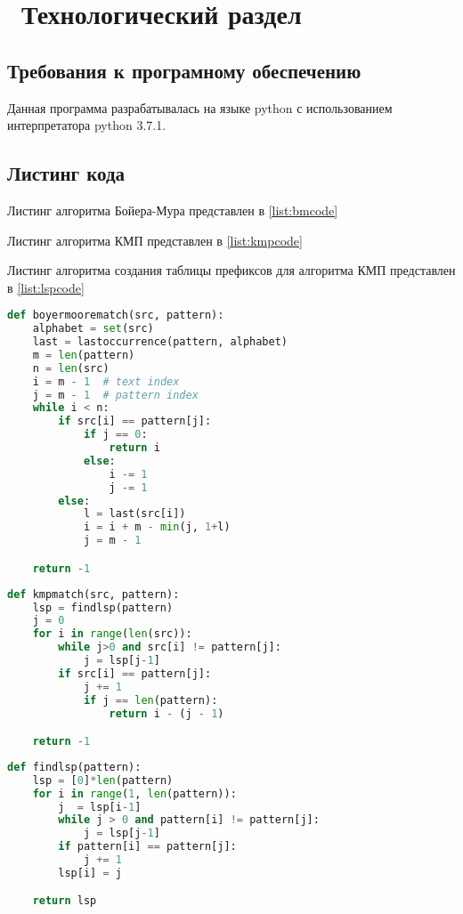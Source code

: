 \chapter{ Технологический раздел}
\section{ Требования к програмному обеспечению}
    Данная программа разрабатывалась на языке python с использованием интерпретатора python 3.7.1.

\section{ Листинг кода}

Листинг алгоритма Бойера-Мура представлен в  \ref{list:bmcode}

Листинг алгоритма КМП представлен в \ref{list:kmpcode}

Листинг алгоритма создания таблицы префиксов для алгоритма КМП представлен в \ref{list:lspcode}

\begin{lstlisting}[language=python, caption={ Листинг реализации алгоритма Бойера-Мура},
                    label={list:bmcode}]
def boyermoorematch(src, pattern):
    alphabet = set(src)
    last = lastoccurrence(pattern, alphabet)
    m = len(pattern)
    n = len(src)
    i = m - 1  # text index
    j = m - 1  # pattern index
    while i < n:
        if src[i] == pattern[j]:
            if j == 0:
                return i
            else:
                i -= 1
                j -= 1
        else:
            l = last(src[i])
            i = i + m - min(j, 1+l)
            j = m - 1 

    return -1
\end{lstlisting}

\begin{lstlisting}[language=python, caption={ Листинг реализации алгоритма КМП},
                    label={list:kmpcode}]
def kmpmatch(src, pattern):
    lsp = findlsp(pattern)
    j = 0
    for i in range(len(src)):
        while j>0 and src[i] != pattern[j]:
            j = lsp[j-1]
        if src[i] == pattern[j]:
            j += 1
            if j == len(pattern):
                return i - (j - 1)

    return -1
\end{lstlisting}
\begin{lstlisting}[language=python, caption={ Листинг реализации создания таблица префиксов},
                    label={list:lspcode}]
def findlsp(pattern):
    lsp = [0]*len(pattern)
    for i in range(1, len(pattern)):
        j  = lsp[i-1]
        while j > 0 and pattern[i] != pattern[j]:
            j = lsp[j-1]
        if pattern[i] == pattern[j]:
            j += 1
        lsp[i] = j

    return lsp
\end{lstlisting}
